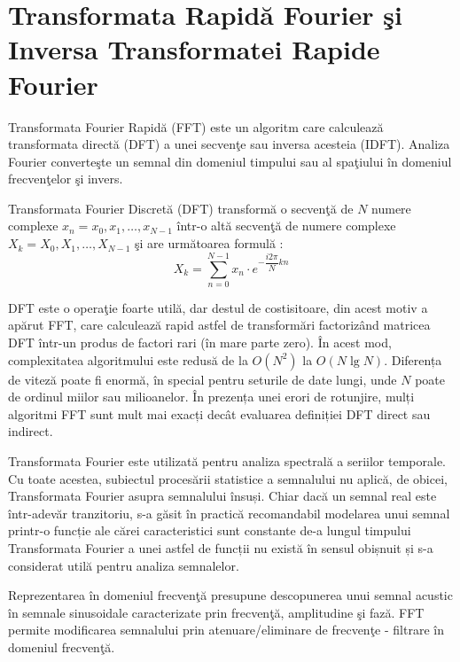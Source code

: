 	\section{Transformata Rapid\u{a} Fourier \c{s}i Inversa Transformatei Rapide Fourier}
	
	Transformata Fourier Rapid\u{a} (FFT) este un algoritm care calculeaz\u{a} transformata direct\u{a} (DFT) a unei secven\c{t}e sau inversa acesteia (IDFT). Analiza Fourier converte\c{s}te un semnal din domeniul timpului sau al spa\c{t}iului \^{i}n domeniul frecven\c{t}elor \c{s}i invers.
	 
	
	Transformata Fourier Discret\u{a} (DFT) transform\u{a} o secven\c{t}\u{a} de $N$ numere complexe ${x_n} = x_0, x_1, \dots, x_{N-1}$ \^{i}ntr-o alt\u{a} secven\c{t}\u{a} de numere complexe ${X_k} = X_0, X_1, \dots, X_{N-1}$ \c{s}i are urm\u{a}toarea formul\u{a} \cite{fft}:
	\begin{equation}
		X_k = \sum_{n=0}^{N-1}x_n \cdot e^{-\dfrac{i2\pi}{N}kn}
	\end{equation}
	 
	
	DFT este o opera\c{t}ie foarte util\u{a}, dar destul de costisitoare, din acest motiv a ap\u{a}rut FFT, care calculeaz\u{a} rapid astfel de transform\u{a}ri factoriz\^{a}nd matricea DFT \^{i}ntr-un produs de factori rari (\^{i}n mare parte zero). \^{I}n acest mod, complexitatea algoritmului este redus\u{a} de la $O(N^2)$ la $O(N\lg N)$. Diferența de viteză poate fi enormă, în special pentru seturile de date lungi, unde $N$ poate de ordinul miilor sau milioanelor. În prezența unei erori de rotunjire, mulți algoritmi FFT sunt mult mai exacți decât evaluarea definiției DFT direct sau indirect.
	 
	Transformata Fourier este utilizată pentru analiza spectrală a seriilor temporale. Cu toate acestea, subiectul procesării statistice a semnalului nu aplică, de obicei, Transformata Fourier asupra semnalului însuși. Chiar dacă un semnal real este într-adevăr tranzitoriu, s-a găsit în practică recomandabil modelarea unui semnal printr-o funcție ale cărei caracteristici sunt constante de-a lungul timpului Transformata Fourier a unei astfel de funcții nu există în sensul obișnuit și s-a considerat utilă pentru analiza semnalelor.

	Reprezentarea \^{i}n domeniul frecven\c{t}\u{a} presupune descopunerea unui semnal acustic \^{i}n semnale sinusoidale caracterizate prin frecven\c{t}\u{a}, amplitudine \c{s}i faz\u{a}. FFT permite modificarea semnalului prin atenuare/eliminare de frecven\c{t}e - filtrare \^{i}n domeniul frecven\c{t}\u{a}.
	 
